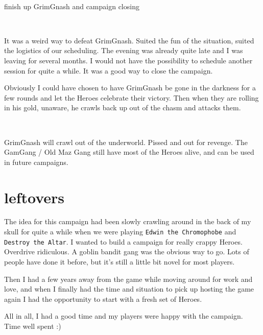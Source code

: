 \

\todo finish up GrimGnash and campaign closing

\

\begin{readoutloud}
It was a weird way to defeat GrimGnash. Suited the fun of the situation, suited the logistics of our scheduling. The evening was already quite late and I was leaving for several months. I would not have the possibility to schedule another session for quite a while. It was a good way to close the campaign.

Obviously I could have chosen to have GrimGnash be gone in the darkness for a few rounds and let the Heroes celebrate their victory. Then when they are rolling in his gold, unaware, he crawls back up out of the chasm and attacks them.

\

GrimGnash will crawl out of the underworld. Pissed and out for revenge. The GamGang / Old Maz Gang still have most of the Heroes alive, and can be used in future campaigns.
\end{readoutloud}































\clearpage
\raggedbottom
\section*{leftovers}

The idea for this campaign had been slowly crawling around in the back of my skull for quite a while when we were playing \texttt{Edwin the Chromophobe} and \texttt{Destroy the Altar}. I wanted to build a campaign for really crappy Heroes. Overdrive ridiculous. A goblin bandit gang was the obvious way to go. Lots of people have done it before, but it's still a little bit novel for most players.

Then I had a few years away from the game while moving around for work and love, and when I finally had the time and situation to pick up hosting the game again I had the opportunity to start with a fresh set of Heroes.

All in all, I had a good time and my players were happy with the campaign. Time well spent :)





